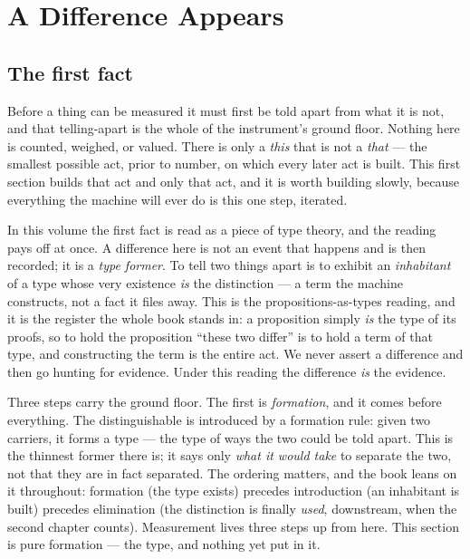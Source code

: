 \chapter{A Difference Appears}

\section{The first fact}

Before a thing can be measured it must first be told apart from what it is not, and that telling-apart is the whole
of the instrument's ground floor. Nothing here is counted, weighed, or valued. There is only a \emph{this} that is
not a \emph{that} --- the smallest possible act, prior to number, on which every later act is built. This first
section builds that act and only that act, and it is worth building slowly, because everything the machine will ever
do is this one step, iterated.

In this volume the first fact is read as a piece of type theory, and the reading pays off at once. A difference here
is not an event that happens and is then recorded; it is a \emph{type former}. To tell two things apart is to exhibit
an \emph{inhabitant} of a type whose very existence \emph{is} the distinction --- a term the machine constructs, not
a fact it files away. This is the propositions-as-types reading, and it is the register the whole book stands in: a
proposition simply \emph{is} the type of its proofs, so to hold the proposition ``these two differ'' is to hold a term
of that type, and constructing the term is the entire act. We never assert a difference and then go hunting for
evidence. Under this reading the difference \emph{is} the evidence.

Three steps carry the ground floor. The first is \emph{formation}, and it comes before everything. The distinguishable
is introduced by a formation rule: given two carriers, it forms a type --- the type of ways the two could be told
apart. This is the thinnest former there is; it says only \emph{what it would take} to separate the two, not that they
are in fact separated. The ordering matters, and the book leans on it throughout: formation (the type exists) precedes
introduction (an inhabitant is built) precedes elimination (the distinction is finally \emph{used}, downstream, when
the second chapter counts). Measurement lives three steps up from here. This section is pure formation --- the type,
and nothing yet put in it.

